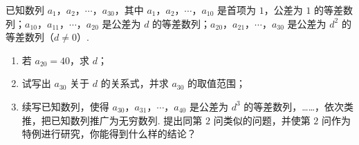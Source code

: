 \begin{problem}
已知数列 \(a_1\)，\(a_2\)，\(\cdots\)，\(a_{30}\)，其中 \(a_1\)，\(a_2\)，\(\cdots\)，\(a_{10}\) 是首项为 \(1\)，公差为 \(1\) 的等差数列；\(a_{10}\)，\(a_{11}\)，\(\cdots\)，\(a_{20}\) 是公差为 \(d\) 的等差数列；\(a_{20}\)，\(a_{21}\)，\(\cdots\)，\(a_{30}\) 是公差为 \(d^2\) 的等差数列（\(d\ne0\)）.

\begin{enumerate}
\item 若 \(a_{20}=40\)，求 \(d\)；
\item 试写出 \(a_{30}\) 关于 \(d\) 的关系式，并求 \(a_{30}\) 的取值范围；
\item 续写已知数列，使得 \(a_{30}\)，\(a_{31}\)，\(\cdots\)，\(a_{40}\) 是公差为 \(d^3\) 的等差数列，……，依次类推，把已知数列推广为无穷数列. 提出同第 \(2\) 问类似的问题，并使第 \(2\) 问作为特例进行研究，你能得到什么样的结论？
\end{enumerate}
\end{problem}

